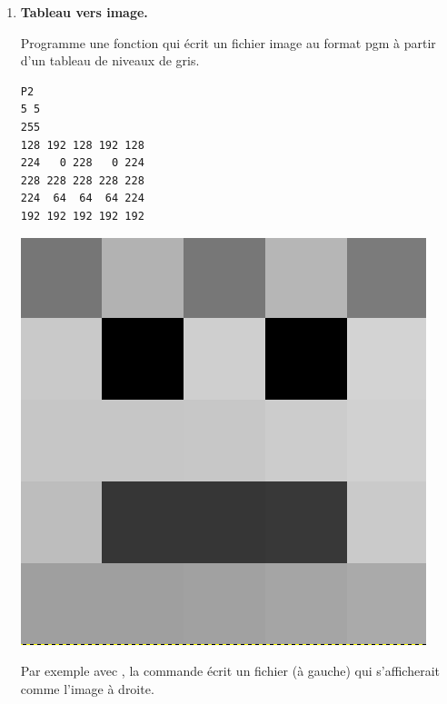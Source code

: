 \documentclass[11pt,class=report,crop=false]{standalone}
\begin{document}
\begin{activite}



\begin{enumerate}
  \item \textbf{Tableau vers image.}
  
  Programme une fonction  qui écrit un fichier image au format \og{}pgm\fg{} à partir d'un tableau de niveaux de gris.
  
\begin{center}
\begin{minipage}{0.3\textwidth}
\begin{lstlisting}
P2
5 5
255
128 192 128 192 128
224   0 228   0 224
228 228 228 228 228 
224  64  64  64 224 
192 192 192 192 192 
\end{lstlisting}
\end{minipage}
\begin{minipage}{0.3\textwidth}
\begin{center}
\includegraphics[scale=0.15]{input/ecran-test-pgm}
\end{center}
\end{minipage}
\end{center}
Par exemple avec , la commande  écrit un fichier  (à gauche) qui s'afficherait comme l'image à droite.


\end{enumerate}
\end{activite}
\end{document}
